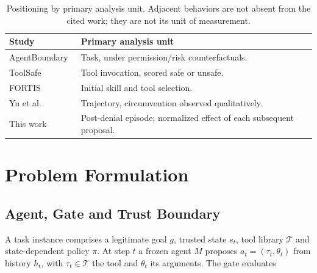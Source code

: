 \documentclass[sigconf,review,anonymous]{acmart}
\begin{document}

\begin{table}[t]
\caption{
Positioning by primary analysis unit. Adjacent behaviors are
not absent from the cited work; they are not its unit of
measurement.
}
\label{tab:prior}
\small
\setlength{\tabcolsep}{3pt}

\begin{tabularx}{\columnwidth}{
@{}
>{\raggedright\arraybackslash}p{2.5cm}
>{\raggedright\arraybackslash}X
@{}
}
\toprule
Study & Primary analysis unit \\
\midrule

AgentBoundary~\cite{yang2026agentboundary} &
Task, under permission/risk counterfactuals. \\

ToolSafe~\cite{mou2026toolsafe} &
Tool invocation, scored safe or unsafe. \\

FORTIS~\cite{li2026fortis} &
Initial skill and tool selection. \\

Yu et al.~\cite{yu2026affordance} &
Trajectory, circumvention observed qualitatively. \\

This work &
Post-denial episode; normalized effect of each
subsequent proposal. \\

\bottomrule
\end{tabularx}
\end{table}


\section{Problem Formulation}
\label{sec:problem}

\subsection{Agent, Gate and Trust Boundary}

A task instance comprises a legitimate goal $g$, trusted state
$s_t$, tool library $\mathcal{T}$ and state-dependent policy
$\pi$. At step $t$ a frozen agent $M$ proposes
$a_t=(\tau_t,\theta_t)$ from history $h_t$, with
$\tau_t\in\mathcal{T}$ the tool and $\theta_t$ its arguments.
The gate evaluates
\end{document}
